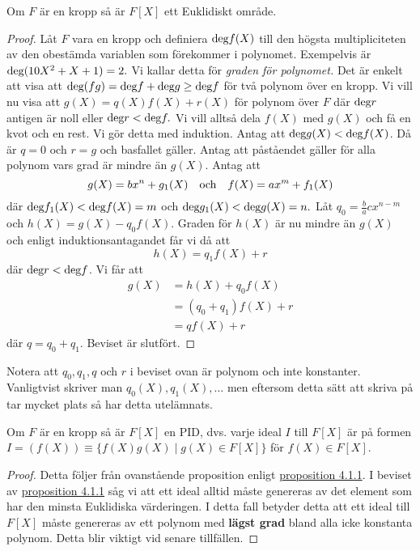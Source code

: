 \documentclass{article}
\newcommand{\grad}[0]{\textnormal{deg}}
\theoremstyle{definition}
\begin{document}
\begin{myprop}{}{}
  Om $F$ är en kropp så är $F[X]$ ett Euklidiskt område. 
\end{myprop}
\begin{proof}
  Låt $F$ vara en kropp och definiera $\grad f(X)$ till den högsta multipliciteten av den obestämda variablen som förekommer i polynomet. Exempelvis är 
  $\grad (10X^2 + X + 1) = 2.$ Vi kallar detta för \textit{graden för polynomet.} Det är enkelt att visa att 
  $\grad (fg) = \grad f + \grad g \geq \grad f$ för två polynom över en kropp. Vi vill nu visa att $g(X) = q(X)f(X) + r(X)$ för polynom över $F$
  där $\grad r$ antigen är noll eller $\grad r < \grad f.$ Vi vill alltså dela $f(X)$ med $g(X)$ och få en kvot och en rest. Vi gör detta med 
  induktion. Antag att $\grad g(X) < \grad f(X)$. Då är $q = 0$ och $r = g$ och basfallet gäller. Antag att påståendet gäller för alla 
  polynom vars grad är mindre än $g(X)$. Antag att 
  \[g(X) = bx^n + g_1(X) \quad \textnormal{och} \quad f(X) = ax^m + f_1(X)\]
  där $\grad f_1(X) < \grad f(X) = m$ och $\grad g_1(X) < \grad g(X) = n.$ Låt $q_0 = \frac{b}{a} cx^{n-m}$ och $h(X) = g(X) - q_0f(X)$. 
  Graden för $h(X)$ är nu mindre än $g(X)$ och enligt induktionsantagandet får vi då att 
  \[h(X) = q_1f(X) + r\]
  där $\grad r < \grad f$. Vi får att 
  \begin{align*}
    g(X) &= h(X) + q_0f(X) \\
    &= (q_0 + q_1)f(X) + r \\
    &= qf(X) + r
  \end{align*}
  där $q = q_0 + q_1.$ Beviset är slutfört.
\end{proof}
Notera att $q_0, q_1, q$ och $r$ i beviset ovan är polynom och inte konstanter. Vanligtvist skriver man $q_0(X), q_1(X), \ldots$ 
men eftersom detta sätt att skriva på tar mycket plats så har detta utelämnats.

\hypertarget{pid}{}
\begin{myprop}{}{}
  Om $F$ är en kropp så är $F[X]$ en PID, dvs. varje ideal $I$ till $F[X]$ är på formen 
  $I = (f(X)) \equiv \{f(X)g(X) \; | \; g(X) \in F[X]\}$ för $f(X) \in F[X].$
\end{myprop}
\begin{proof}
  Detta följer från ovanstående proposition enligt 
  \hyperlink{eukpid}{proposition 4.1.1}.
  I beviset av \hyperlink{eukpid}{proposition 4.1.1} såg vi att ett ideal alltid måste genereras av det element som har den 
  minsta Euklidiska värderingen. I detta fall betyder detta att ett ideal till $F[X]$ måste genereras av ett polynom med \textbf{lägst grad} bland 
  alla icke konstanta polynom. Detta blir viktigt vid senare tillfällen.
\end{proof}
\end{document}
